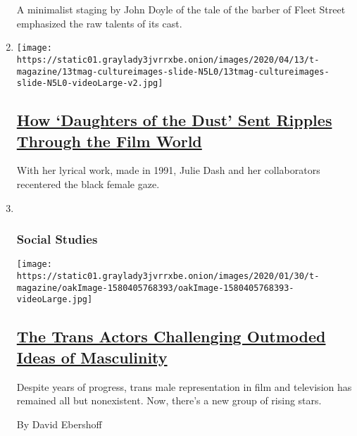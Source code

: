 \begin{enumerate}
  A minimalist staging by John Doyle of the tale of the barber of Fleet
  Street emphasized the raw talents of its cast.
\item
  \texttt{[image: https://static01.graylady3jvrrxbe.onion/images/2020/04/13/t-magazine/13tmag-cultureimages-slide-N5L0/13tmag-cultureimages-slide-N5L0-videoLarge-v2.jpg]}

  \hypertarget{how-daughters-of-the-dust-sent-ripples-through-the-film-world}{%
  \subsection{\texorpdfstring{\href{/interactive/2020/04/13/t-magazine/daughters-of-the-dust.html}{How
  `Daughters of the Dust' Sent Ripples Through the Film
  World}}{How `Daughters of the Dust' Sent Ripples Through the Film World}}\label{how-daughters-of-the-dust-sent-ripples-through-the-film-world}}

  With her lyrical work, made in 1991, Julie Dash and her collaborators
  recentered the black female gaze.
\item ~
  \hypertarget{social-studies}{%
  \subsubsection{Social Studies}\label{social-studies}}

  \texttt{[image: https://static01.graylady3jvrrxbe.onion/images/2020/01/30/t-magazine/oakImage-1580405768393/oakImage-1580405768393-videoLarge.jpg]}

  \hypertarget{the-trans-actors-challenging-outmoded-ideas-of-masculinity}{%
  \subsection{\texorpdfstring{\href{/2020/02/04/t-magazine/trans-actors.html}{The
  Trans Actors Challenging Outmoded Ideas of
  Masculinity}}{The Trans Actors Challenging Outmoded Ideas of Masculinity}}\label{the-trans-actors-challenging-outmoded-ideas-of-masculinity}}

  Despite years of progress, trans male representation in film and
  television has remained all but nonexistent. Now, there's a new group
  of rising stars.

  By David Ebershoff
\end{enumerate}


